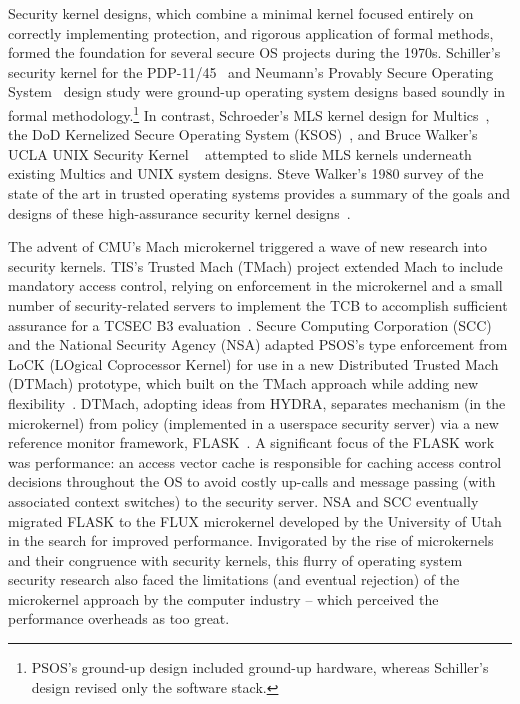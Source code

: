 Security kernel designs, which combine a minimal kernel focused entirely on correctly
implementing protection, and rigorous application of formal methods, formed the foundation
for several secure OS projects during the 1970s.
Schiller's security kernel for the PDP-11/45~\cite{Schiller75} and Neumann's Provably
Secure Operating System~\cite{PSOS} design study were ground-up operating system designs
based soundly in formal methodology.\footnote{PSOS's ground-up design included ground-up hardware,
whereas Schiller's design revised only the software stack.}
In contrast, Schroeder's MLS kernel design for Multics~\cite{schroeder:multicssecuritykernel},
the DoD Kernelized Secure Operating System (KSOS)~\cite{McCauley}, and Bruce Walker's UCLA UNIX
Security Kernel ~\cite{walker:uclasecureunix} attempted to slide MLS kernels underneath existing
Multics and UNIX system designs.
Steve Walker's 1980 survey of the state of the art in trusted operating systems provides a summary
of the goals and designs of these high-assurance security kernel
designs~\cite{walker:adventtrusted}.

The advent of CMU's Mach microkernel triggered a wave of new research into security kernels.
TIS's Trusted Mach (TMach) project extended Mach to include mandatory access
control, relying on enforcement in the microkernel and a small number of
security-related servers to implement the TCB to accomplish sufficient
assurance for a TCSEC B3 evaluation~\cite{BranstadLandauer89}.
Secure Computing Corporation (SCC) and the National Security Agency (NSA) adapted PSOS's
type enforcement from LoCK (LOgical Coprocessor Kernel)
for use in a new Distributed
Trusted Mach (DTMach) prototype, which built on the TMach approach while adding
new flexibility~\cite{sebes:dtmach}.
DTMach, adopting ideas from HYDRA, separates mechanism (in the microkernel) from
policy (implemented in a userspace security server) via a new reference monitor
framework, FLASK~\cite{spencer:flask}.
A significant focus of the FLASK work was performance: an access vector cache is
responsible for caching access control decisions throughout
the OS to avoid costly up-calls and message passing (with associated context switches) to the
security server.
NSA and SCC eventually migrated FLASK to the FLUX microkernel developed by the University of
Utah in the search for improved performance.
Invigorated by the rise of
microkernels and their congruence with security kernels, 
this flurry of operating system security research also faced the limitations
(and eventual rejection) of the microkernel approach by the computer industry --
which perceived the performance overheads as too great.

